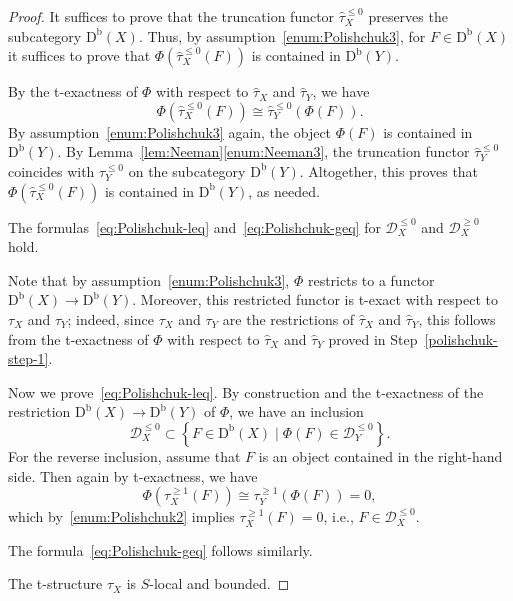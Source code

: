 \documentclass[11pt, reqno]{amsart}
\numberwithin{equation}{section}
\theoremstyle{plain}
\theoremstyle{remark}
\theoremstyle{definition}
\theoremstyle{italicsname}
\newenvironment{step}[1]
{\renewcommand\theinnerstep{#1}\innerstep}
{\endinnerstep}
\newcommand{\st}{\mid}
\newcommand{\Db}{\mathrm{D^b}}
\newcommand{\cD}{\mathscr{D}}
\begin{document}
\begin{proof}
It suffices to prove that the truncation functor $\widehat{\tau}_X^{\leqslant 0}$ preserves the subcategory $\Db(X)$. 
Thus, by assumption~\ref{enum:Polishchuk3}, for $F \in \Db(X)$ it suffices to prove that $\Phi(\widehat{\tau}_X^{\leqslant 0}(F))$ is contained in $\Db(Y)$. 

By the t-exactness of $\Phi$ with respect to $\widehat{\tau}_X$ and $\widehat{\tau}_Y$, we have 
$$\Phi(\widehat{\tau}_X^{\leqslant 0}(F)) \cong \widehat{\tau}_Y^{\leqslant 0}(\Phi(F)).$$
By assumption~\ref{enum:Polishchuk3} again, the object $\Phi(F)$ is contained in $\Db(Y)$. 
By Lemma~\ref{lem:Neeman}\ref{enum:Neeman3}, the truncation functor $\widehat{\tau}_Y^{\leqslant 0}$ coincides with $\tau_Y^{\leqslant 0}$ on the subcategory $\Db(Y)$. 
Altogether, this proves that $\Phi(\widehat{\tau}_X^{\leqslant 0}(F))$ is contained in $\Db(Y)$, as needed. 

\begin{step}{3}
The formulas~\eqref{eq:Polishchuk-leq} and~\eqref{eq:Polishchuk-geq} for $\cD_X^{\leqslant 0}$ and $\cD_X^{\geqslant 0}$ hold. 
\end{step} 

Note that by assumption~\ref{enum:Polishchuk3}, $\Phi$ restricts to a functor $\Db(X) \to \Db(Y)$. 
Moreover, this restricted functor is t-exact with respect to $\tau_X$ and $\tau_Y$; indeed, since $\tau_X$ and $\tau_Y$ are the restrictions of $\widehat{\tau}_X$ and $\widehat{\tau}_Y$, this follows from the t-exactness of $\Phi$ with respect to $\widehat{\tau}_X$ and $\widehat{\tau}_Y$ proved in Step~\ref{polishchuk-step-1}.    

Now we prove~\eqref{eq:Polishchuk-leq}. 
By construction and the t-exactness of the restriction $\Db(X) \to \Db(Y)$ of $\Phi$, we have an inclusion 
\begin{equation*}
\cD_X^{\leqslant0} \subset \left\{F\in\Db(X)\st \Phi(F)\in\cD_Y^{\leqslant0}\right\}. 
\end{equation*} 
For the reverse inclusion, assume that $F$ is an object contained in the right-hand side. 
Then again by t-exactness, we have 
\begin{equation*}
    \Phi(\tau_X^{\geqslant 1}(F)) \cong \tau_Y^{\geqslant 1}(\Phi(F)) = 0,
\end{equation*}
which by~\ref{enum:Polishchuk2} implies $\tau_X^{\geqslant 1}(F) = 0$, i.e., $F \in \cD_X^{\leqslant 0}$. 

The formula~\eqref{eq:Polishchuk-geq} follows similarly.

\begin{step}{4}
The t-structure $\tau_X$ is $S$-local and bounded. 
\end{step} 


\end{proof}
\end{document}
